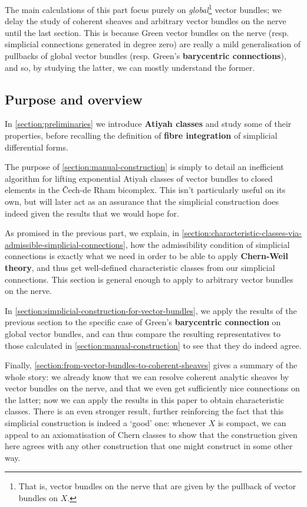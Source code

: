 \documentclass[11pt,fleqn]{article}
\theoremstyle{plain}
\theoremstyle{definition}
\theoremstyle{remark}
\numberwithin{equation}{theorem}
\newcommand{\define}[1]{\textbf{#1}}
\begin{document}
    The main calculations of this part focus purely on \emph{global}\footnote{That is, vector bundles on the nerve that are given by the pullback of vector bundles on $X$.} vector bundles; we delay the study of coherent sheaves and arbitrary vector bundles on the nerve until the last section.
    This is because Gre{}en vector bundles on the nerve (resp. simplicial connections generated in degree zero) are really a mild generalisation of pullbacks of global vector bundles (resp. Green's \define{barycentric connections}), and so, by studying the latter, we can mostly understand the former.

    \subsection{Purpose and overview}

        In \cref{section:preliminaries} we introduce \define{Atiyah classes} and study some of their properties, before recalling the definition of \define{fibre integration} of simplicial differential forms.

        The purpose of \cref{section:manual-construction} is simply to detail an inefficient algorithm for lifting exponential Atiyah classes of vector bundles to closed elements in the Čech-de Rham bicomplex.
        This isn't particularly useful on its own, but will later act as an assurance that the simplicial construction does indeed given the results that we would hope for.

        As promised in the previous part, we explain, in \cref{section:characteristic-classes-via-admissible-simplicial-connections}, how the admissibility condition of simplicial connections is exactly what we need in order to be able to apply \define{Chern-Weil theory}, and thus get well-defined characteristic classes from our simplicial connections.
        This section is general enough to apply to arbitrary vector bundles on the nerve.

        In \cref{section:simplicial-construction-for-vector-bundles}, we apply the results of the previous section to the specific case of Green's \define{barycentric connection} on global vector bundles, and can thus compare the resulting representatives to those calculated in \cref{section:manual-construction} to see that they do indeed agree.

        Finally, \cref{section:from-vector-bundles-to-coherent-sheaves} gives a summary of the whole story: we already know that we can resolve coherent analytic sheaves by vector bundles on the nerve, and that we even get sufficiently nice connections on the latter; now we can apply the results in this paper to obtain characteristic classes.
        There is an even stronger result, further reinforcing the fact that this simplicial construction is indeed a `good' one: whenever $X$ is compact, we can appeal to an axiomatisation of Chern classes to show that the construction given here agrees with any other construction that one might construct in some other way.
\end{document}
